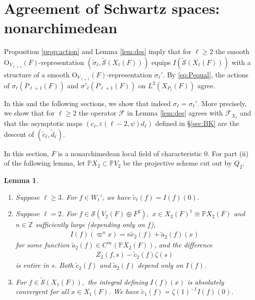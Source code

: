 \documentclass[11pt,a4paper,reqno]{amsart}
\newtheorem{lem}[thm]{Lemma}
\theoremstyle{remark}
\numberwithin{equation}{section}
\newcommand{\ZZ}{\mathbb{Z}}
\theoremstyle{definition}
\numberwithin{equation}{section}
\begin{document}
\section{Agreement of Schwartz spaces: nonarchimedean}\label{sec:agree}

Proposition \ref{prop:action} and  Lemma \ref{lem:des} imply that for $\ell\ge 2$ the smooth $\mathrm{O}_{V_{\ell+1}}(F)$-representation $(\tilde{\sigma}_\ell,\widetilde{\mathcal{S}}(X_{\ell}(F)))$ equips $I(\widetilde{\mathcal{S}}({X_\ell}(F)))$ with a structure of a smooth $\mathrm{O}_{V_{\ell+1}}(F)$-representation $\sigma_\ell'$. By \eqref{eq:Pequal}, the actions of $\sigma_\ell(P_{\ell+1}(F))$ and $\sigma'_\ell(P_{\ell+1}(F))$ on $L^2(X_{P_{\ell}}(F))$ agree. 

In this and the following sections, we show that indeed $\sigma_\ell=\sigma_\ell'.$ More precisely, we show that for $\ell\ge 2$ the operator $\mathcal{F}$ in Lemma \ref{lem:des} agrees with $\mathcal{F}_{X_\ell}$ and that the asymptotic maps $(c_\ell,\varepsilon(\ell-2,\psi)d_\ell)$ defined in \S\ref{sec:BK} are the descent of $(\tilde{c}_\ell,\tilde{d}_\ell).$ 

In this section, $F$ is a nonarchimedean local field of characteristic $0.$ For part (ii) of the following lemma, let $\mathbb{P}X_2 \subset \mathbb{P}V_2$ be the projective scheme cut out by $Q_2.$ 



\begin{lem}\label{lem:easy}
\begin{enumerate}[label=(\roman*)]
    \item  Suppose $\ell\ge 3$. For $f\in W_\ell'$, we have $\tilde{c}_\ell(f)= I(f)(0).$
    \item Suppose $\ell=2$. For $f\in\mathcal{S}(V_2(F)\oplus F^2),$ $x\in X_{2}(F)^1\cong \mathbb{P}X_2(F)$ and  $n\in \ZZ$ sufficiently large (depending only on $f$),
    \begin{align*}
        I(f)(\varpi^nx)=n\tilde{c}_2(f)+\tilde{a}_2(f)(x)
    \end{align*}
    for some function $\tilde{a}_2(f)\in C^\infty(\mathbb{P}X_2(F))$, and the difference
    \begin{align*}
 Z_{2}(f,s)-\tilde{c}_2(f)\zeta(s)
    \end{align*}
    is entire in $s.$ Both $\tilde{c}_2(f)$ and $\tilde{a}_2(f)$ depend only on $I(f)$.
    \item For $f\in \widetilde{\mathcal{S}}(X_1(F)),$ the integral defining $I(f)(x)$ is absolutely convergent for all $x\in X_1(F)$. We have $\tilde{c}_1(f)=\zeta(1)^{-1}I(f)(0).$
\end{enumerate}

\end{lem}
\end{document}
